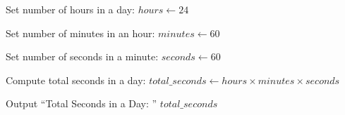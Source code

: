 \begin{algorithm}
\caption{Calculate Total Seconds in a Day}
\begin{algorithmic}[1]

\STATE Set number of hours in a day:
\STATE $hours \gets 24$

\STATE Set number of minutes in an hour:
\STATE $minutes \gets 60$

\STATE Set number of seconds in a minute:
\STATE $seconds \gets 60$

\STATE Compute total seconds in a day:
\STATE $total\_seconds \gets hours \times minutes \times seconds$

\STATE Output ``Total Seconds in a Day: '' $total\_seconds$

\end{algorithmic}
\end{algorithm}